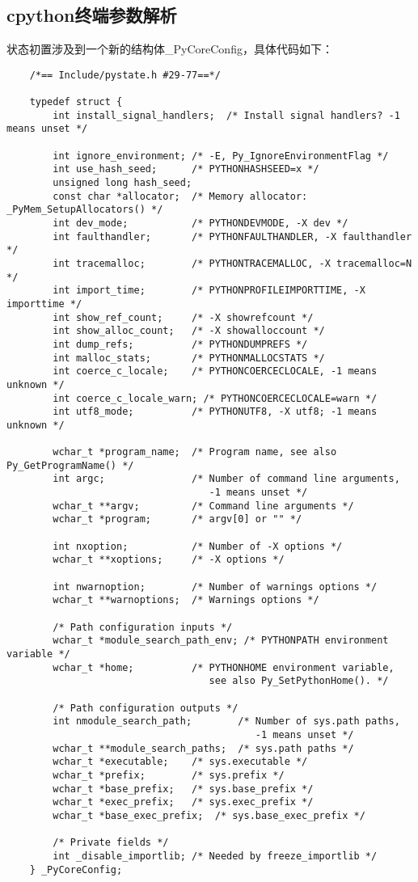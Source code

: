 \documentclass[UTF8]{book}
\begin{document}
\subsection{cpython终端参数解析}
 状态初置涉及到一个新的结构体\_PyCoreConfig，具体代码如下：
\begin{lstlisting}
    /*== Include/pystate.h #29-77==*/

    typedef struct {
        int install_signal_handlers;  /* Install signal handlers? -1 means unset */
    
        int ignore_environment; /* -E, Py_IgnoreEnvironmentFlag */
        int use_hash_seed;      /* PYTHONHASHSEED=x */
        unsigned long hash_seed;
        const char *allocator;  /* Memory allocator: _PyMem_SetupAllocators() */
        int dev_mode;           /* PYTHONDEVMODE, -X dev */
        int faulthandler;       /* PYTHONFAULTHANDLER, -X faulthandler */
        int tracemalloc;        /* PYTHONTRACEMALLOC, -X tracemalloc=N */
        int import_time;        /* PYTHONPROFILEIMPORTTIME, -X importtime */
        int show_ref_count;     /* -X showrefcount */
        int show_alloc_count;   /* -X showalloccount */
        int dump_refs;          /* PYTHONDUMPREFS */
        int malloc_stats;       /* PYTHONMALLOCSTATS */
        int coerce_c_locale;    /* PYTHONCOERCECLOCALE, -1 means unknown */
        int coerce_c_locale_warn; /* PYTHONCOERCECLOCALE=warn */
        int utf8_mode;          /* PYTHONUTF8, -X utf8; -1 means unknown */
    
        wchar_t *program_name;  /* Program name, see also Py_GetProgramName() */
        int argc;               /* Number of command line arguments,
                                   -1 means unset */
        wchar_t **argv;         /* Command line arguments */
        wchar_t *program;       /* argv[0] or "" */
    
        int nxoption;           /* Number of -X options */
        wchar_t **xoptions;     /* -X options */
    
        int nwarnoption;        /* Number of warnings options */
        wchar_t **warnoptions;  /* Warnings options */
    
        /* Path configuration inputs */
        wchar_t *module_search_path_env; /* PYTHONPATH environment variable */
        wchar_t *home;          /* PYTHONHOME environment variable,
                                   see also Py_SetPythonHome(). */
    
        /* Path configuration outputs */
        int nmodule_search_path;        /* Number of sys.path paths,
                                           -1 means unset */
        wchar_t **module_search_paths;  /* sys.path paths */
        wchar_t *executable;    /* sys.executable */
        wchar_t *prefix;        /* sys.prefix */
        wchar_t *base_prefix;   /* sys.base_prefix */
        wchar_t *exec_prefix;   /* sys.exec_prefix */
        wchar_t *base_exec_prefix;  /* sys.base_exec_prefix */
    
        /* Private fields */
        int _disable_importlib; /* Needed by freeze_importlib */
    } _PyCoreConfig;
    
\end{lstlisting}\par
\end{document}
